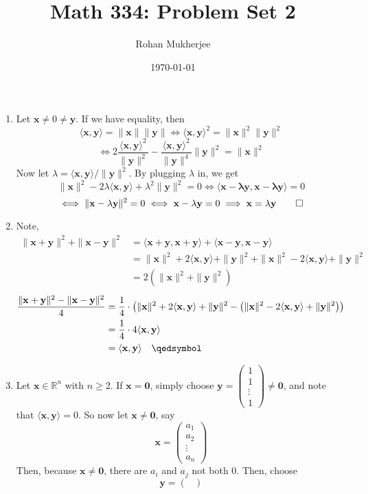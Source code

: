 \documentclass[12pt]{article}
\title{Math 334: Problem Set 2}
\author{Rohan Mukherjee}
\date{\today}
\newcommand{\ip}[2]{\langle \mathbf{#1}, \mathbf{#2} \rangle}
\newcommand{\mg}[1]{\| \mathbf{#1} \|}
\newcommand{\R}{\mathbb{R}}
\begin{document}
	\maketitle
	\begin{enumerate}[leftmargin=\labelsep]
		\item Let $\mathbf{x} \neq 0 \neq \mathbf{y}$. If we have equality, then 
		$$ \ip{x}{y} = \mg{x}\mg{y} \iff \ip{x}{y}^2=\mg{x}^2\mg{y}^2$$
		$$\iff 2\frac{\ip{x}{y}^2}{\mg{y}^2} - \frac{\ip{x}{y}^2}{\mg{y}^4}\mg{y}^2=\mg{x}^2$$
		Now let $\lambda = \ip{x}{y}/\mg{y}^2$. By plugging $\lambda$ in, we get
		$$\mg{x}^2-2\lambda\ip{x}{y} + \lambda^2\mg{y}^2=0 \iff \ip{x-\lambda y}{x-\lambda y} = 0$$
		$$\iff \mg{x-\lambda y}^2 = 0 \iff \mathbf{x}-\lambda \mathbf{y} = 0 \implies \mathbf{x} = \lambda \mathbf{y} \qed$$
		
		\item Note,
		\begin{align*}\mg{x+y}^2+\mg{x-y}^2 &= \ip{x+y}{x+y} + \ip{x-y}{x-y} 
		\\ &= \mg{x}^2 + 2\ip{x}{y} + \mg{y}^2 + \mg{x}^2 -2\ip{x}{y} + \mg{y}^2
		\\ &= 2(\mg{x}^2 + \mg{y}^2)
		\end{align*}
		\begin{align*}
			\frac{\mg{x+y}^2-\mg{x-y}^2}{4} &= \frac14 \cdot \left(\mg{x}^2 + 2\ip{x}{y} + \mg{y}^2 - \left(\mg{x}^2 -2\ip{x}{y} + \mg{y}^2\right)\right)
			\\&= \frac14 \cdot 4\ip{x}{y}
			\\&= \ip{x}{y} \quad\qedsymbol
		\end{align*}
		\item
		Let $\mathbf{x} \in \R^n$ with $n \geq 2$. If $\mathbf{x} = \mathbf{0}$, simply choose $\mathbf{y} = \begin{pmatrix}
			1 \\ 1 \\ \vdots \\ 1
		\end{pmatrix} \neq \mathbf{0}$, and note that $\ip{x}{y} = 0$. So now let $\mathbf{x} \neq \mathbf{0}$, say $$\mathbf{x} = \begin{pmatrix}
		a_1 \\
		a_2 \\
		\vdots \\
		a_n
		\end{pmatrix}$$ Then, because $\mathbf{x} \neq \mathbf{0}$, there are $a_i$ and $a_j$ not both 0. Then, choose $$\mathbf{y} = \begin{pmatrix}

\end{pmatrix}$$
\end{enumerate}
\end{document}
